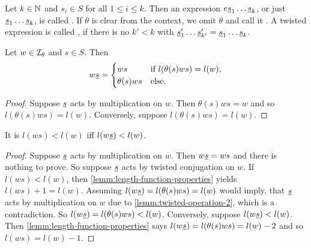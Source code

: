 \begin{defi}
	Let $k \in \mathbb{N}$ and $s_{i} \in S$ for all $1 \leq i \leq k$. Then an expression $e \underline{s}_1 \ldots \underline{s}_k$, or just $\underline{s}_1 \ldots \underline{s}_k$, is called . If $\theta$ is clear from the context, we omit $\theta$ and call it . A twisted expression is called , if there is no $k' < k$ with $\underline{s}'_1 \ldots \underline{s}'_{k'} = \underline{s}_1 \ldots \underline{s}_k$.
\end{defi}

\begin{lemm}
	Let $w \in \mathcal{I}_{\theta}$ and $s \in S$. Then
	$$ w \underline{s} = \begin{cases}
		ws & \textrm{if } l(\theta(s)ws) = l(w), \\
		\theta(s)ws & \textrm{else}. \\
	\end{cases} $$

	\begin{proof}
		Suppose $\underline{s}$ acts by multiplication on $w$. Then $\theta(s)ws = w$ and so $l(\theta(s)ws) = l(w)$. Conversely, suppose $l(\theta(s)ws) = l(w)$. \todo
	\end{proof}
\end{lemm}

\begin{lemm}
	It is $l(ws) < l(w)$ iff $l(w \underline{s}) < l(w)$.

	\begin{proof}
		Suppose $\underline{s}$ acts by multiplication on $w$. Then $w \underline{s} = ws$ and there is nothing to prove. So suppose $\underline{s}$ acts by twisted conjugation on $w$. If $l(ws) < l(w)$, then \ref{lemm:length-function-properties} yields $l(ws) + 1 = l(w)$. Assuming $l(w \underline{s}) = l(\theta(s)ws) = l(w)$ would imply, that $\underline{s}$ acts by multiplication on $w$ due to \ref{lemm:twisted-operation-2}, which is a contradiction. So $l(w \underline{s}) = l(\theta(s)ws) < l(w)$. Conversely, suppose $l(w \underline{s}) < l(w)$. Then \ref{lemm:length-function-properties} says $l(w \underline{s}) = l(\theta(s)ws) = l(w) - 2$ and so $l(ws) = l(w) - 1$.
	\end{proof}
\end{lemm}

